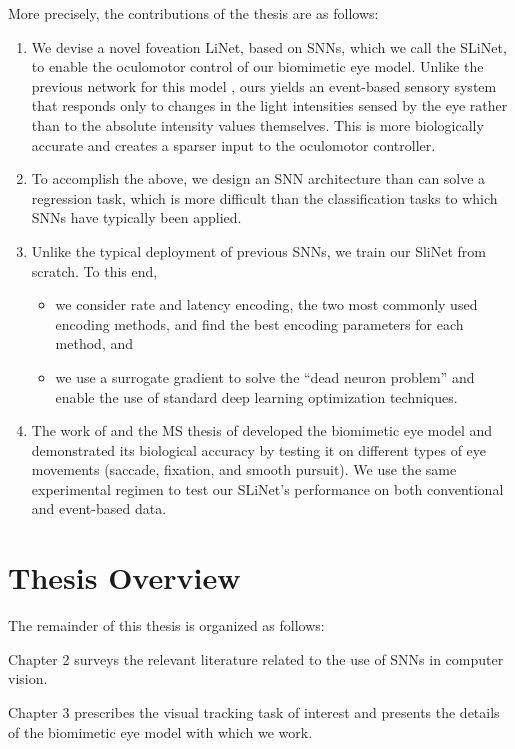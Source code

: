 \documentclass [MS] {UCLAthesis}
\begin{document}
More precisely, the contributions of the thesis are as follows:
\begin{enumerate}
    \item We devise a novel foveation LiNet, based on SNNs, which we call the SLiNet, to enable the oculomotor control of our biomimetic eye model. Unlike the previous network for this model \citep{Arjun}, ours yields an event-based sensory system that responds only to changes in the light intensities sensed by the eye rather than to the absolute intensity values themselves. This is more biologically accurate and creates a sparser input to the oculomotor controller.
    \item To accomplish the above, we design an SNN architecture than can solve a regression task, which is more difficult than the classification tasks to which SNNs have typically been applied.
  \item Unlike the typical deployment of previous SNNs, we train our SliNet from scratch. To this end,
  \begin{itemize}
    \item we consider rate and latency encoding, the two most commonly used encoding methods, and find the best encoding parameters for each method, and
    \item we use a surrogate gradient to solve the ``dead neuron problem'' and enable the use of standard deep learning optimization techniques.
  \end{itemize}
  \item The work of \citet{Arjun} and the MS thesis of \citet{Arjun_thesis} developed the biomimetic eye model and demonstrated its biological accuracy by testing it on different types of eye movements (saccade, fixation, and smooth pursuit). We use the same experimental regimen to test our SLiNet's performance on both conventional and event-based data.
\end{enumerate}


\section{Thesis Overview}

The remainder of this thesis is organized as follows:

Chapter 2 surveys the relevant literature related to the use of SNNs in computer vision.

Chapter 3 prescribes the visual tracking task of interest and presents the details of the biomimetic eye model with which we work.
\end{document}
